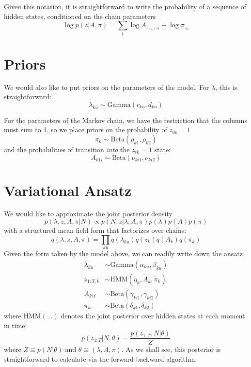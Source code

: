 \documentclass[11pt]{article}
\begin{document}
Given this notation, it is straightforward to write the probability of a sequence of hidden states, conditioned on the chain parameters
\begin{equation}
    \log p(z|A, \pi) = \sum_t \log A_{z_{t+1} z_t} + \log \pi_{z_0}
\end{equation}

\section{Priors}
We would also like to put priors on the parameters of the model. For $\lambda$, this is straightforward:
\begin{equation}
    \lambda_{ku} \sim \mathrm{Gamma}(c_{ku}, d_{ku})
\end{equation}

For the parameters of the Markov chain, we have the restriction that the columns must sum to 1, so we place priors on the probability of $z_{0k} = 1$
\begin{equation}
    \pi_{k} \sim \mathrm{Beta}(\rho_{k1}, \rho_{k2})
\end{equation}
and the probabilities of transition \emph{into} the $z_{tk} = 1$ state:
\begin{equation}
    A_{k1i} \sim \mathrm{Beta}(\nu_{ki1}, \nu_{ki2})
\end{equation}

\section{Variational Ansatz}
We would like to approximate the joint posterior density
\begin{equation}
    p(\lambda, z, A, \pi|N) \propto p(N, z|\lambda, A, \pi) p(\lambda) p(A) p(\pi)
\end{equation}
with a structured mean field form that factorizes over chains:
\begin{equation}
     q(\lambda, z, A, \pi) = \prod_{ku} q(\lambda_{ku}) q(z_k) q(A_k) q(\pi_k)
\end{equation} 
Given the form taken by the model above, we can readily write down the ansatz
\begin{align} 
    \lambda_{ku} &\sim \mathrm{Gamma}(\alpha_{ku}, \beta_{ku}) \\
    z_{1:T, k} &\sim \mathrm{HMM}(\eta_k, \tilde{A}_k, \tilde{\pi}_k) \\
    A_{k1i} &\sim \mathrm{Beta}(\gamma_{ki1}, \gamma_{ki2}) \\
    \pi_k &\sim \mathrm{Beta}(\delta_{k1}, \delta_{k2})
\end{align}
where $\mathrm{HMM}(\ldots)$ denotes the joint posterior over hidden states at each moment in time:
\begin{equation}
    p(z_{1:T}|N, \theta) = \frac{p(z_{1:T}, N|\theta)}{Z}
\end{equation}
where $Z \equiv p(N|\theta)$ and $\theta \equiv (\lambda, A, \pi)$. As we shall see, this posterior is straightforward to calculate via the forward-backward algorithm.
\end{document}
